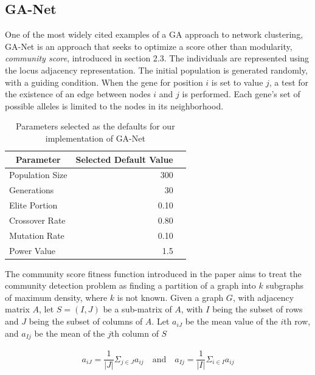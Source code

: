 \subsection{GA-Net}

One of the most widely cited examples of a GA approach to network clustering, GA-Net\cite{Pizzuti2008} is an approach that seeks to optimize a score other than modularity, \textit{community score}, introduced in section 2.3. The individuals are represented using the locus adjacency representation. The initial population is generated randomly, with a guiding condition. When the gene for position $i$ is set to value $j$, a test for the existence of an edge between nodes $i$ and $j$ is performed. Each gene's set of possible alleles is limited to the nodes in its neighborhood. 

\begin{table}[h!]
	\centering
	\begin{tabular}{|l | r| r|}
		\hline
		\multicolumn{1}{|c|}{\textbf{Parameter}} & \multicolumn{1}{|c|}{\textbf{Selected Default Value}}\\
		\hline
		\hline
		Population Size &  300 \\
		\hline
		Generations &  30 \\
		\hline
		Elite Portion & 0.10 \\
		\hline
		Crossover Rate & 0.80 \\
		\hline
		Mutation Rate & 0.10 \\
		\hline
		Power Value & 1.5 \\ [0.2ex] 
		\hline
	\end{tabular}
	\caption{Parameters selected as the defaults for our implementation of GA-Net}
	\label{table:ganetdef}
\end{table}

The community score fitness function introduced in the paper aims to treat the community detection problem as finding a partition of a graph into $k$ subgraphs of maximum density, where $k$ is not known. Given a graph $G$, with adjacency matrix $A$, let $S=(I, J)$ be a sub-matrix of $A$, with $I$ being the subset of rows and $J$ being the subset of columns of $A$. Let $a_{iJ}$ be the mean value of the $i$th row, and $a_{Ij}$ be the mean of the $j$th column of $S$


\begin{align*}
a_{iJ}=\dfrac{1}{|J|}\Sigma_{j\in J}a_{ij}\nonumber \quad\text{and}\quad 
a_{Ij}=\dfrac{1}{|I|}\Sigma_{i\in I}a_{ij}
\end{align*}

